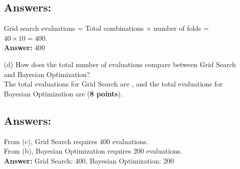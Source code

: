 \documentclass{article}
\begin{document}
\begin{enumerate}
            \subsection*{Answers:}
            Grid search evaluations = Total combinations $\times$ number of folds = $40 \times 10 = 400$. \\
            \textbf{Answer:} 400
      \item[(d)] How does the total number of evaluations compare between Grid Search
            and Bayesian Optimization? \\
            The total evaluations for Grid Search are \underline{\hspace{3cm}}, and the
            total evaluations for Bayesian Optimization are \underline{\hspace{3cm}} (\textbf{8 points}).
            \subsection*{Answers:}
            From (c), Grid Search requires 400 evaluations. \\
            From (b), Bayesian Optimization requires 200 evaluations. \\
            \textbf{Answer:} Grid Search: 400, Bayesian Optimization: 200
\end{enumerate}
\end{document}
